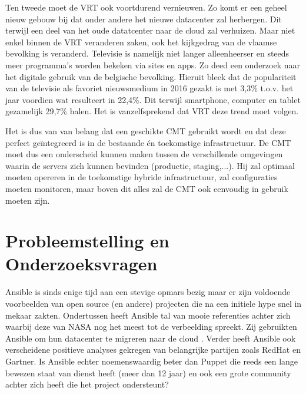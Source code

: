 Ten tweede moet de \gls{VRT} ook voortdurend vernieuwen. Zo komt er een geheel nieuw gebouw bij dat onder andere het nieuwe datacenter zal herbergen. Dit terwijl een deel van het oude datatcenter naar de cloud zal verhuizen. Maar niet enkel binnen de \gls{VRT} veranderen zaken, ook het kijkgedrag van de vlaamse bevolking is veranderd. Televisie is namelijk niet langer alleenheerser en steeds meer programma's worden bekeken via sites en apps. Zo deed \textcite{digimeter} een onderzoek naar het digitale gebruik van de belgische bevolking. Hieruit bleek dat de populariteit van de televisie als favoriet nieuwsmedium in 2016 gezakt is met 3,3\% t.o.v. het jaar voordien wat resulteert in 22,4\%. Dit terwijl smartphone, computer en tablet gezamelijk 29,7\% halen. Het is vanzelfsprekend dat \gls{VRT} deze trend moet volgen.

Het is dus van van belang dat een geschikte \gls{CMT} gebruikt wordt en dat deze perfect ge\"integreerd is in de bestaande \'en toekomstige infrastructuur. De CMT moet dus een onderscheid kunnen maken tussen de verschillende omgevingen waarin de servers zich kunnen bevinden (productie, staging,...). Hij zal optimaal moeten opereren in de toekomstige hybride infrastructuur, zal configuraties moeten monitoren, maar boven dit alles zal de \gls{CMT} ook eenvoudig in gebruik moeten zijn.\newline







\section{Probleemstelling en Onderzoeksvragen}
\label{sec:onderzoeksvragen}

Ansible is sinds enige tijd aan een stevige opmars bezig maar er zijn voldoende voorbeelden van open source (en andere) projecten die na een initiele hype snel in mekaar zakten. Ondertussen heeft Ansible tal van mooie referenties achter zich waarbij deze van NASA nog het meest tot de verbeelding spreekt. Zij gebruikten Ansible om hun datacenter te migreren naar de cloud \autocite{nasacasestudy}.  Verder heeft Ansible ook verscheidene positieve analyses gekregen van belangrijke partijen zoals RedHat en Gartner. Is Ansible echter noemenswaardig beter dan Puppet die reeds een lange bewezen staat van dienst heeft (meer dan 12 jaar) en ook een grote community achter zich heeft die het project ondersteunt?

